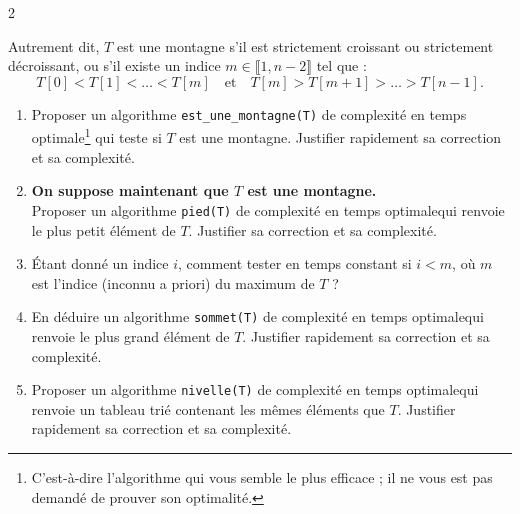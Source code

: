 \documentclass{article}
\begin{document}
\begin{paracol}{2}
{Autrement dit, \(T\) est une montagne s'il est strictement croissant ou strictement décroissant, ou s'il existe un indice \(m \in \llbracket 1, n-2 \rrbracket\) tel que :
\[
T[0] < T[1] < \dots < T[m]
\quad \text{et} \quad
T[m] > T[m+1] > \dots > T[n-1].
\]

\begin{enumerate}
    \item Proposer un algorithme \texttt{est\_une\_montagne(T)} de complexité en temps optimale\footnote{C'est-à-dire l'algorithme qui vous semble le plus efficace ; il ne vous est pas demandé de prouver son optimalité.} qui teste si \(T\) est une montagne.  
    Justifier rapidement sa correction et sa complexité.

    \item \textbf{On suppose maintenant que \(T\) est une montagne.}\\  
    Proposer un algorithme \texttt{pied(T)} de complexité en temps optimale\footnotemark[1] qui renvoie le plus petit élément de \(T\).  
    Justifier sa correction et sa complexité.

    \item Étant donné un indice \(i\), comment tester en temps constant si \(i < m\), où \(m\) est l'indice (inconnu a priori) du maximum de \(T\) ?

    \item En déduire un algorithme \texttt{sommet(T)} de complexité en temps optimale\footnotemark[1] qui renvoie le plus grand élément de \(T\).  
    Justifier rapidement sa correction et sa complexité.

    \item Proposer un algorithme \texttt{nivelle(T)} de complexité en temps optimale\footnotemark[1] qui renvoie un tableau trié contenant les mêmes éléments que \(T\).  
    Justifier rapidement sa correction et sa complexité.
\end{enumerate}
}

\end{paracol}
\end{document}

